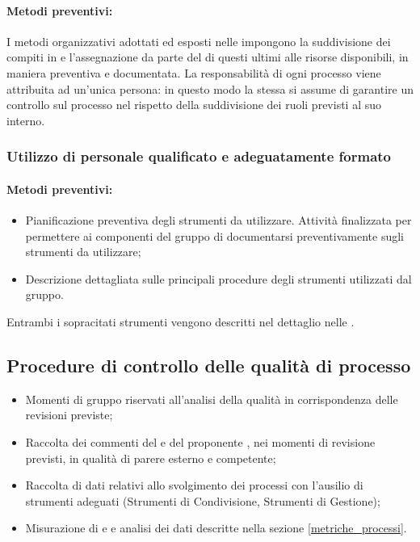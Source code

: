\documentclass[12pt,a4paper]{article}
\begin{document}
\paragraph{Metodi preventivi:}
I metodi organizzativi adottati ed esposti nelle \NdP{} impongono la suddivisione dei compiti in  e l'assegnazione da parte del \PM{} di questi ultimi alle risorse disponibili, in maniera preventiva e documentata. 
La responsabilità di ogni processo viene attribuita ad un'unica persona: in questo modo la stessa si assume di garantire un controllo sul processo nel rispetto della suddivisione dei ruoli previsti al suo interno.

\subsubsection{Utilizzo di personale qualificato e adeguatamente formato}
\paragraph{Metodi preventivi:}
\begin{itemize}
	\item Pianificazione preventiva degli strumenti da utilizzare. Attività finalizzata per permettere ai componenti del gruppo di documentarsi preventivamente sugli strumenti da utilizzare;
	\item Descrizione dettagliata sulle principali procedure degli strumenti utilizzati dal gruppo.
\end{itemize}
Entrambi i sopracitati strumenti vengono descritti nel dettaglio nelle \NdP{}.


\subsection{Procedure di controllo delle qualità di processo}
\begin{itemize}
	\item Momenti di gruppo riservati all'analisi della qualità in corrispondenza delle revisioni previste;
	\item Raccolta dei commenti del \Vardanega{} e del proponente \Zucchetti{}, nei momenti di revisione previsti, in qualità di parere esterno e competente;
	\item Raccolta di dati relativi allo svolgimento dei processi con l'ausilio di strumenti adeguati (Strumenti di Condivisione, Strumenti di Gestione);
	\item Misurazione di  e  e analisi dei dati descritte nella sezione \ref{metriche_processi}.	
\end{itemize}
\end{document}
